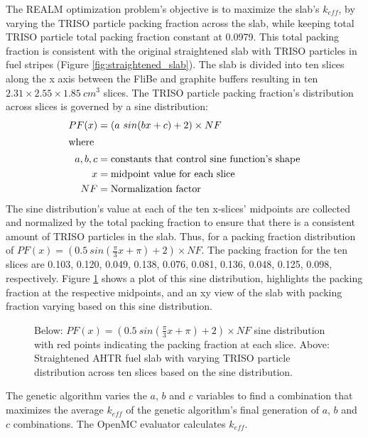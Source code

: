 The \gls{REALM} optimization problem's objective is to maximize the slab's 
$k_{eff}$, by varying the \gls{TRISO} particle packing fraction across the slab,
while keeping total \gls{TRISO} particle total packing fraction constant at 0.0979. 
This total packing fraction is consistent with the original straightened slab with 
TRISO particles in fuel stripes (Figure \ref{fig:straightened_slab}). 
The slab is divided into ten slices along the x axis between the FliBe and graphite 
buffers resulting in ten $2.31 \times 2.55 \times 1.85\ cm^3$ slices. 
The \gls{TRISO} particle packing fraction's distribution across slices is 
governed by a sine distribution: 
\begin{align}
    PF(x) &= (a\ sin(bx + c) + 2) \times NF\\
    \intertext{where}
    a, b, c &= \mbox{constants that control sine function's shape} \nonumber \\
    x &= \mbox{midpoint value for each slice} \nonumber \\
    NF &= \mbox{Normalization factor} \nonumber
\end{align}
The sine distribution's value at each of the ten x-slices' midpoints are collected and 
normalized by the total packing fraction to ensure that there is a consistent 
amount of \gls{TRISO} particles in the slab. 
Thus, for a packing fraction distribution of 
$PF(x) = (0.5\ sin(\frac{\pi}{3}x + \pi) + 2)  \times NF$. 
The packing fraction for the ten slices are 0.103, 0.120, 0.049, 0.138, 
0.076, 0.081, 0.136, 0.048, 0.125, 0.098, respectively. 
Figure \ref{fig:triso_distribution} shows a plot of this sine distribution, highlights 
the packing fraction at the respective midpoints, and an xy view of the slab
with packing fraction varying based on this sine distribution. 
\begin{figure}[]
    \centering
    \caption{Below: $PF(x) = (0.5\ sin(\frac{\pi}{3}x + \pi) + 2)  \times NF$ 
    sine distribution with red points indicating the packing fraction at each slice. 
    Above: Straightened \acrlong{AHTR} fuel slab with varying \gls{TRISO} particle 
    distribution across ten slices based on the sine distribution. }
    \label{fig:triso_distribution}
\end{figure}
The genetic algorithm varies the $a$, $b$ and $c$ variables to find a combination 
that maximizes the average $k_{eff}$ of the genetic algorithm's final generation 
of $a$, $b$ and $c$ combinations.
The OpenMC evaluator calculates $k_{eff}$. 


